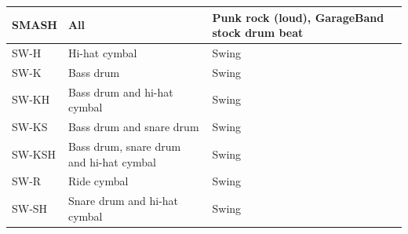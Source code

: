 \documentclass[a4paper, 11pt]{article}
\begin{document}
\begin{table}[htbp]
\begin{tabular}{|p{3cm}|p{5cm}|l|}
\hline 
SMASH & All & Punk rock (loud), GarageBand stock drum beat\\
\hline 
SW-H & Hi-hat cymbal & Swing\\
\hline 
SW-K & Bass drum & Swing\\
\hline 
SW-KH & Bass drum and hi-hat cymbal & Swing\\
\hline 
SW-KS & Bass drum and snare drum & Swing\\
\hline 
SW-KSH & Bass drum, snare drum and hi-hat cymbal & Swing\\
\hline 
SW-R & Ride cymbal & Swing\\
\hline 
SW-SH & Snare drum and hi-hat cymbal & Swing\\
\hline
\end{tabular}
\label{tab: beats}
\end{table}
\end{document}
